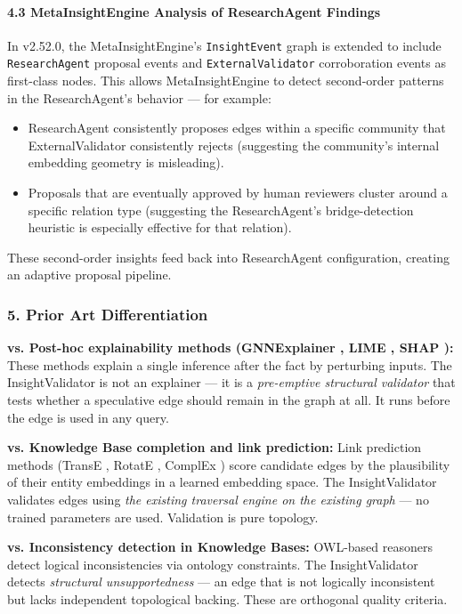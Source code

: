 \paragraph{4.3 MetaInsightEngine Analysis of ResearchAgent Findings}
In v2.52.0, the MetaInsightEngine's \texttt{InsightEvent} graph is extended to include \texttt{ResearchAgent} proposal events and \texttt{ExternalValidator} corro\-boration events as first-class nodes. This allows MetaInsightEngine to detect second-order patterns in the ResearchAgent's behavior — for example:

\begin{itemize}
\item ResearchAgent consi\-stently proposes edges within a specific community that ExternalValidator consi\-stently rejects (suggesting the community's internal embedding geometry is misleading).
\item Proposals that are eventually approved by human reviewers cluster around a specific relation type (suggesting the ResearchAgent's bridge-detection heuristic is especially effective for that relation).

\end{itemize}
These second-order insights feed back into ResearchAgent confi\-guration, creating an adaptive proposal pipeline.

\subsubsection{5. Prior Art Differ\-entiation}

\textbf{vs. Post-hoc expla\-inability methods (GNNExplainer \cite{ying2019gnnexplainer}, LIME \cite{ribeiro2016lime}, SHAP \cite{lundberg2017shap}):} These methods explain a single inference after the fact by perturbing inputs. The InsightValidator is not an explainer — it is a \textit{pre-emptive structural validator} that tests whether a speculative edge should remain in the graph at all. It runs before the edge is used in any query.

\textbf{vs. Knowledge Base completion and link prediction:} Link prediction methods (TransE \cite{bordes2013transe}, RotatE \cite{sun2019rotate}, ComplEx \cite{trouillon2016complex}) score candidate edges by the plaus\-ibility of their entity embeddings in a learned embedding space. The InsightValidator validates edges using \textit{the existing traversal engine on the existing graph} — no trained parameters are used. Validation is pure topology.

\textbf{vs. Incons\-istency detection in Knowledge Bases:} OWL-based reasoners \cite{horrocks2004owl} detect logical incon\-sistencies via ontology constraints. The InsightValidator detects \textit{structural unsup\-portedness} — an edge that is not logically incon\-sistent but lacks independent topological backing. These are orthogonal quality criteria.

